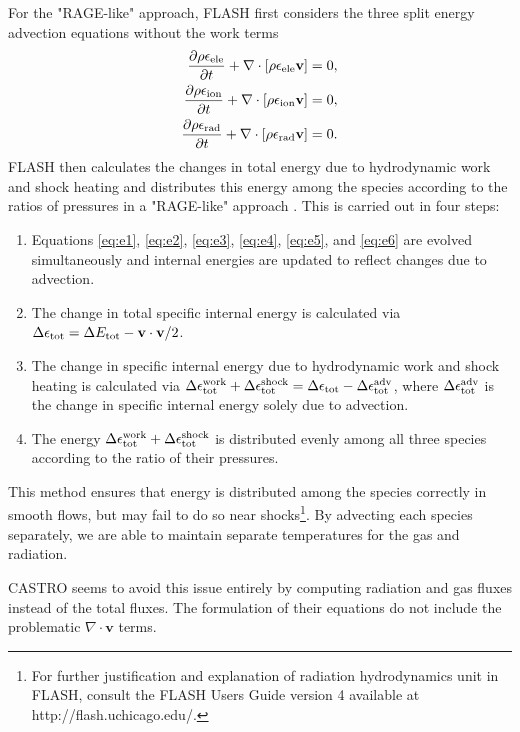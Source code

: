 \documentclass[preprint,11pt]{aastex}
\newcommand{\bea}{\begin{eqnarray}}
\newcommand{\eea}{\end{eqnarray}}
\begin{document}
{For the "RAGE-like" approach, FLASH first considers the three split energy advection equations without the work terms
\bea 
\label{eq:e4}
\frac{\partial \rho \epsilon_{\rm ele}}{\partial t} + \nabla \cdot [\rho \epsilon_{\rm ele} \mathbf{v}] = 0, \\
\label{eq:e5}
\frac{\partial \rho \epsilon_{\rm ion}}{\partial t} + \nabla \cdot [\rho \epsilon_{\rm ion} \mathbf{v}] = 0, \\
\label{eq:e6}
\frac{\partial \rho \epsilon_{\rm rad}}{\partial t} + \nabla \cdot [\rho \epsilon_{\rm rad} \mathbf{v}] = 0.
\eea
FLASH then calculates the changes in total energy due to hydrodynamic work and shock heating and distributes this energy among the species according to the ratios of pressures in a "RAGE-like" approach \citep{Gittings:08}.  This is carried out in four steps:
\begin{enumerate}
  \item Equations \ref{eq:e1}, \ref{eq:e2}, \ref{eq:e3}, \ref{eq:e4}, \ref{eq:e5}, and \ref{eq:e6} are evolved simultaneously and internal energies are updated to reflect changes due to advection.
  \item The change in total specific internal energy is calculated via $\Delta \epsilon_{\rm tot} = \Delta E_{\rm tot} - \mathbf{v} \cdot \mathbf{v} / 2$.
  \item The change in specific internal energy due to hydrodynamic work and shock heating is calculated via $\Delta \epsilon^{\rm work}_{\rm tot} + \Delta \epsilon^{\rm shock}_{\rm tot} = \Delta \epsilon_{\rm tot} - \Delta \epsilon_{\rm tot}^{\rm adv}$, where $\Delta \epsilon_{\rm tot}^{\rm adv}$ is the change in specific internal energy solely due to advection.
  \item The energy $\Delta \epsilon^{\rm work}_{\rm tot} + \Delta \epsilon^{\rm shock}_{\rm tot}$ is distributed evenly among all three species according to the ratio of their pressures.
\end{enumerate}
This method ensures that energy is distributed among the species correctly in smooth flows, but may fail to do so near shocks\footnote{For further justification and explanation of radiation hydrodynamics unit in FLASH, consult the FLASH Users Guide version 4 available at http://flash.uchicago.edu/.}.  By advecting each species separately, we are able to maintain separate temperatures for the gas and radiation.} {\color{blue} CASTRO seems to avoid this issue entirely by computing radiation and gas fluxes instead of the total fluxes.  The formulation of their equations do not include the problematic $\nabla \cdot \mathbf{v}$ terms.}
\end{document}
